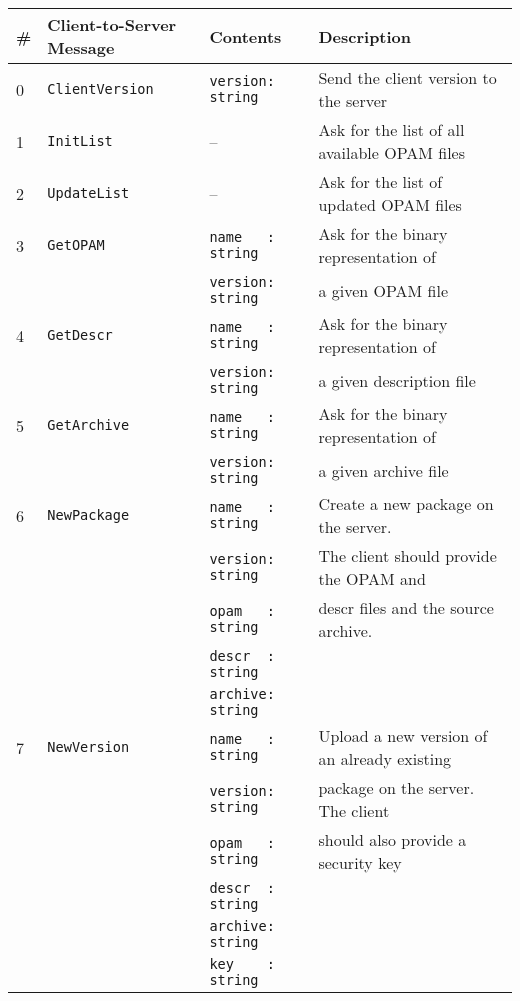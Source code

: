 \documentclass[a4paper,11pt]{article}
\begin{document}
\begin{itemize}
{\small
\begin{tabular}{|l|l|l|l|}
\hline
\# & Client-to-Server Message & Contents & Description \\
\hline
\hline
0 & \verb+ClientVersion+ & \verb+version: string+ & Send the client version to the server \\
\hline
1 & \verb+InitList+ & -- & Ask for the list of all available OPAM files \\
\hline
2 & \verb+UpdateList+ & -- & Ask for the list of updated OPAM files \\
\hline
3 & \verb+GetOPAM+ & \verb+name   : string+ & Ask for the binary representation of \\
  &                & \verb+version: string+ & a given OPAM file \\
\hline
4 & \verb+GetDescr+ & \verb+name   : string+ & Ask for the binary representation of \\
  &                 & \verb+version: string+ & a given description file \\
\hline
5 & \verb+GetArchive+ & \verb+name   : string+ & Ask for the binary representation of \\
  &                   & \verb+version: string+ & a given archive file \\
\hline
6 & \verb+NewPackage+ & \verb+name   : string+ & Create a new package on the server. \\
  &                   & \verb+version: string+ & The client should provide the OPAM and \\
  &                   & \verb+opam   : string+ & descr files and the source archive. \\
  &                   & \verb+descr  : string+ & \\
  &                   & \verb+archive: string+ & \\
\hline
7 & \verb+NewVersion+ & \verb+name   : string+ & Upload a new version of an already existing \\
  &                   & \verb+version: string+ & package on the server. The client \\
  &                   & \verb+opam   : string+ & should also provide a security key\\
  &                   & \verb+descr  : string+ & \\
  &                   & \verb+archive: string+ & \\
  &                   & \verb+key    : string+ & \\
\hline
\end{tabular}
}


\end{itemize}
\end{document}
